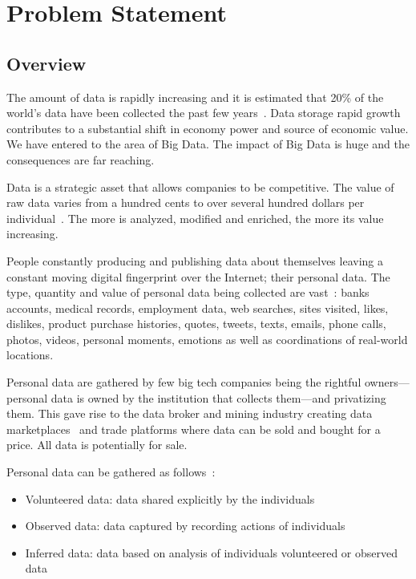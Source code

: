 \chapter{Problem Statement}
\label{problem}

\section{Overview}
\label{problem:overview}

The amount of data is rapidly increasing and it is estimated that 20\% of the world's data have been collected the past
few years~\cite{10.1109/SPW.2015.27,big_data_better_worse}. Data storage rapid growth contributes to a substantial shift in economy power and source of economic value. We have entered to the area of Big Data. The impact of Big Data is huge and the consequences are far reaching.

Data is a strategic asset that allows companies to be competitive. The value of raw data varies from a hundred cents to over several hundred dollars per individual~\cite{pr_data_cost_1, pr_data_cost_2, pr_data_cost_3}. The more is analyzed, modified and enriched, the more its value increasing.

People constantly producing and publishing data about themselves
leaving a constant moving digital fingerprint over the Internet; their personal data. The type, quantity and value of personal data
being collected are vast~\cite{emergence_new_assets_wef}: banks accounts, medical records, employment data, web searches, sites visited,
likes, dislikes, product purchase histories, quotes, tweets, texts, emails, phone calls, photos, videos, personal moments, emotions
as well as coordinations of real-world locations.

Personal data are gathered by few big tech companies being the rightful owners---personal data is owned by the institution that collects them---and privatizing them. This gave rise to the data broker and mining industry creating data marketplaces~\cite{dawex, q_dx, datastreamx} and trade platforms where data can be sold and bought for a price. All data is potentially for sale.

Personal data can be gathered as follows~\cite{emergence_new_assets_wef}:

\begin{itemize}
  \item Volunteered data: data shared explicitly by the individuals
  \item Observed data: data captured by recording actions of individuals
  \item Inferred data: data based on analysis of individuals volunteered or observed data
\end{itemize}

